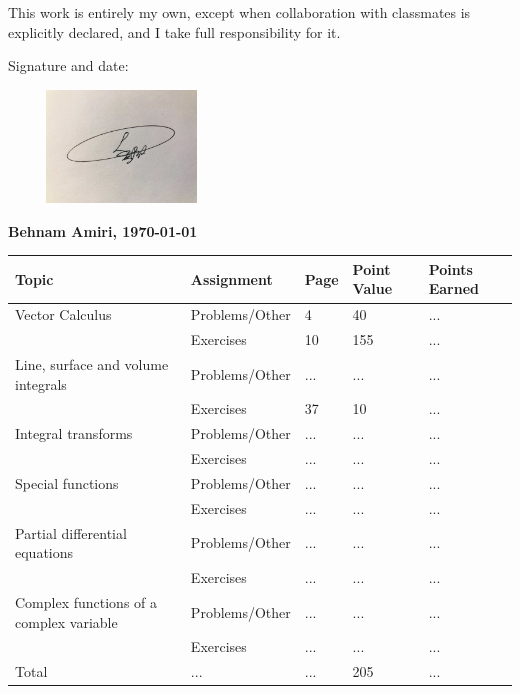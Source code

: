 \documentclass[fleqn]{article}
\begin{document}
\bigbreak

\Large This work is entirely my own, except when collaboration with classmates is explicitly declared, and I take full responsibility for it.

\bigbreak

\Large Signature and date:

\bigbreak

\bigbreak


\includegraphics[height=3cm, width=6cm]{signature.jpg}

\Large \textbf{ Behnam Amiri, \today }


\pagebreak

\begin{singlespace}
  \begin{tabular}{ |p{3cm}|||p{4cm}|p{2cm}|p{2cm}|p{2cm}|  }
      \hline
      Topic & Assignment & Page & Point Value & Points Earned \\
      \hline
      Vector Calculus & \cellcolor{contents} Problems/Other & \cellcolor{contents} 4 &\cellcolor{contents} 40 &\cellcolor{contents}  ... \\
      & \cellcolor{contents} Exercises &\cellcolor{contents}  10 & \cellcolor{contents}  155 &\cellcolor{contents}  ... \\
      \hline
      Line, surface and volume integrals & Problems/Other & ... & ... & ... \\
      & Exercises & 37 & 10 & ... \\
      \hline
      Integral transforms & \cellcolor{contents} Problems/Other &\cellcolor{contents}  ... &\cellcolor{contents}  ... & \cellcolor{contents} ... \\
      & \cellcolor{contents} Exercises &\cellcolor{contents}  ... &\cellcolor{contents}  ... &\cellcolor{contents}  ... \\
      \hline
      Special functions & Problems/Other & ... & ... & ... \\
      & Exercises & ... & ... & ... \\
      \hline
      Partial differential equations  &\cellcolor{contents} Problems/Other &\cellcolor{contents} ... &\cellcolor{contents} ... &\cellcolor{contents} ... \\
      & \cellcolor{contents} Exercises &\cellcolor{contents}  ... &\cellcolor{contents}  ... &\cellcolor{contents}  ... \\
      \hline
      Complex functions of a complex variable & Problems/Other & ...  & ... & ... \\
      & Exercises  & ...  & ... & ... \\
      \hline
      Total & ... & ... & 205 & ... \\
      \hline
  \end{tabular}
\end{singlespace}
\end{document}

